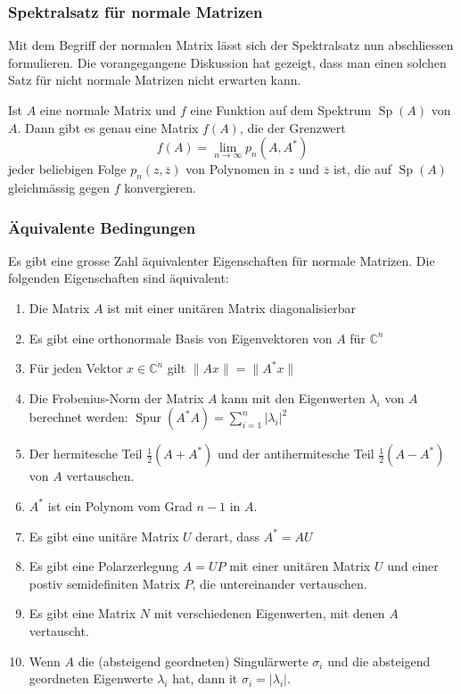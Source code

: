 \subsubsection{Spektralsatz für normale Matrizen}
Mit dem Begriff der normalen Matrix lässt sich der Spektralsatz nun
abschliessen formulieren.
Die vorangegangene Diskussion hat gezeigt, dass man einen solchen
Satz für nicht normale Matrizen nicht erwarten kann.

\begin{satz}
\label{buch:eigenwerte:satz:spektralnormal}
Ist $A$ eine normale Matrix und $f$ eine Funktion auf dem Spektrum
$\operatorname{Sp}(A)$ von $A$.
Dann gibt es genau eine Matrix $f(A)$, die der Grenzwert
\[
f(A)
=
\lim_{n\to\infty} p_n(A,A^*)
\]
jeder beliebigen
Folge $p_n(z,\overline{z})$ von Polynomen in $z$ und $\overline{z}$ ist,
die auf $\operatorname{Sp}(A)$ gleichmässig gegen $f$ konvergieren.
\end{satz}

\subsubsection{Äquivalente Bedingungen}
Es gibt eine grosse Zahl äquivalenter Eigenschaften für normale Matrizen.
Die folgenden Eigenschaften sind äquivalent:
\begin{enumerate}
\item
Die Matrix $A$ ist mit einer unitären Matrix diagonalisierbar
\item
Es gibt eine orthonormale Basis von Eigenvektoren von $A$ für $\mathbb{C}^n$
\item
Für jeden Vektor $x\in\mathbb{C}^n$ gilt $\|Ax\|=\|A^*x\|$
\item
Die Frobenius-Norm der Matrix $A$ kann mit den Eigenwerten $\lambda_i$
%
von $A$ berechnet werden:
$\operatorname{Spur}(A^*A) = \sum_{i=1}^n |\lambda_i|^2$
\item
Der hermitesche Teil $\frac12(A+A^*)$ und der antihermitesche Teil
$\frac12(A-A^*)$ von $A$ vertauschen.
%
%
\item
$A^*$ ist ein Polynom vom Grad $n-1$ in $A$.
\item
Es gibt eine unitäre Matrix $U$ derart, dass $A^*=AU$
%
\item
Es gibt eine Polarzerlegung $A=UP$ mit einer unitären Matrix $U$ und
einer postiv semidefiniten Matrix $P$, die untereinander vertauschen.
\item
Es gibt eine Matrix $N$ mit verschiedenen Eigenwerten, mit denen $A$
vertauscht.
\item
Wenn $A$ die (absteigend geordneten) Singulärwerte $\sigma_i$ und
%
die absteigend geordneten Eigenwerte $\lambda_i$ hat,
dann it $\sigma_i=|\lambda_i|$.
\end{enumerate}




